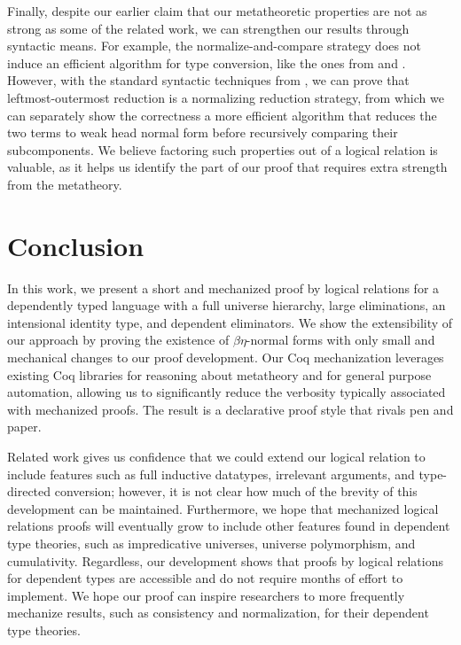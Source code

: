 \documentclass[\ifpublic nolinenum\else\fi,online,OA]{jfp}
\newcommand{\scw}[1]{}
\newcommand{\yl}[1]{}
\theoremstyle{definition}
\begin{document}
\ifextended
Finally, despite our earlier claim that our metatheoretic properties
are not as strong as some of the related work, we can strengthen our
results through syntactic means. For example, the
normalize-and-compare strategy does not induce an efficient algorithm
for type conversion, like the ones from \citet{decagda} and
\citet{martin-lof-a-la-coq}. However, with the standard syntactic
techniques from \citet{takahashi-parallel-reduction,
factorization-essentially}, we can prove that leftmost-outermost
reduction is a normalizing reduction strategy, from which we can
separately show the correctness a more efficient algorithm that
reduces the two terms to weak head normal form before recursively
comparing their subcomponents. We believe factoring such properties
out of a logical relation is valuable, as it helps us identify the
part of our proof that requires extra strength from the metatheory.
\scw{Why don't we just use leftmost-outermost reduction in the first place?
Do we even need nondeterministic parallel reduction?}
\yl{The conversion uses full reduction. Nondeterministic reduction
  makes it harder to show that convertible types have the same
  meaning. Maybe it would require us to prove factorization in our
  development but it definitely simplifies the determinism proof
  (confluence is no longer required before the fundamental
  lemma). }
\fi

\section{Conclusion}
\label{sec:conclusion}
In this work, we present a short and mechanized proof by logical relations for
a dependently typed language with a full universe hierarchy, large
eliminations, an intensional identity type, and dependent eliminators.  We
show the extensibility of our approach by proving the existence of
$\beta\eta$-normal forms with only small and mechanical changes to our proof
development.  Our Coq mechanization leverages existing Coq libraries for
reasoning about metatheory and for general purpose automation, allowing us to
significantly reduce the verbosity typically associated with mechanized
proofs. The result is a declarative proof style that rivals pen and paper.

Related work gives us confidence that we could extend our logical relation to
include features such as full inductive datatypes, irrelevant arguments, and
type-directed conversion; however, it is not clear how much of the brevity of
this development can be maintained.  Furthermore, we hope that mechanized
logical relations proofs will eventually grow to include other features found
in dependent type theories, such as impredicative universes, universe
polymorphism, and cumulativity.  Regardless, our development shows that proofs
by logical relations for dependent types are accessible and do not require
months of effort to implement.  We hope our proof can inspire researchers to
more frequently mechanize results, such as consistency and normalization, for
their dependent type theories.
\end{document}
